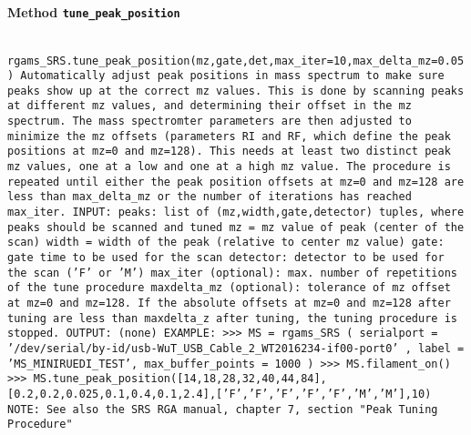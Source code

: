 \paragraph{Method \texttt{tune_peak_position}}
\vspace{1ex}
\texttt{\newline
rgams_SRS.tune_peak_position(mz,gate,det,max_iter=10,max_delta_mz=0.05)\newline
\newline
Automatically adjust peak positions in mass spectrum to make sure peaks show up at the correct mz values. This is done by scanning peaks at different mz values, and determining their offset in the mz spectrum. The mass spectromter parameters are then adjusted to minimize the mz offsets (parameters RI and RF, which define the peak positions at mz=0 and mz=128). This needs at least two distinct peak mz values, one at a low and one at a high mz value. The procedure is repeated until either the peak position offsets at mz=0 and mz=128 are less than max_delta_mz or the number of iterations has reached max_iter.\newline
\newline
INPUT:\newline
peaks: list of (mz,width,gate,detector) tuples, where peaks should be scanned and tuned\newline
mz = mz value of peak (center of the scan)\newline
width = width of the peak (relative to center mz value)\newline
gate: gate time to be used for the scan\newline
detector: detector to be used for the scan ('F' or 'M')\newline
max_iter (optional): max. number of repetitions of the tune procedure\newline
maxdelta_mz (optional): tolerance of mz offset at mz=0 and mz=128. If the absolute offsets at mz=0 and mz=128 after tuning are less than maxdelta_z after tuning, the tuning procedure is stopped.\newline
\newline
OUTPUT:\newline
(none)\newline
\newline
EXAMPLE:\newline
>>> MS = rgams_SRS ( serialport = '/dev/serial/by-id/usb-WuT_USB_Cable_2_WT2016234-if00-port0' , label = 'MS_MINIRUEDI_TEST', max_buffer_points = 1000 )\newline
>>> MS.filament_on()\newline
>>> MS.tune_peak_position([14,18,28,32,40,44,84],[0.2,0.2,0.025,0.1,0.4,0.1,2.4],['F','F','F','F','F','M','M'],10)\newline
\newline
NOTE:\newline
See also the SRS RGA manual, chapter 7, section "Peak Tuning Procedure"\newline
\newline
}


